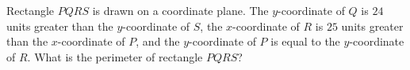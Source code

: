 Rectangle $PQRS$ is drawn on a coordinate plane. The $y$-coordinate of $Q$ is $24$ units greater than the $y$-coordinate of $S$, the $x$-coordinate of $R$ is $25$ units greater than the $x$-coordinate of $P$, and the $y$-coordinate of $P$ is equal to the $y$-coordinate of $R$. What is the perimeter of rectangle $PQRS$?
